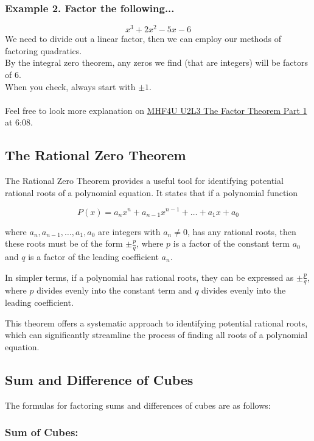 \documentclass{article}
\begin{document}
\subsubsection*{Example 2. Factor the following...}
$$x^3 + 2x^2 -5x - 6$$
We need to divide out a linear factor, then we can employ our
methods of factoring quadratics. \\
By the integral zero theorem, any zeros we find (that are integers)
will be factors of 6. \\
When you check, always start with $\pm 1$.\\\\
Feel free to look more explanation on \href{https://www.youtube.com/watch?v=7Hny2n6t83Y}{MHF4U U2L3 The Factor Theorem Part 1} at 6:08.

\subsection*{The Rational Zero Theorem}
The Rational Zero Theorem provides a useful tool for identifying potential rational roots of a polynomial equation. It states that if a polynomial function

\[ P(x) = a_nx^n + a_{n-1}x^{n-1} + \ldots + a_1x + a_0 \]

where \( a_n, a_{n-1}, \ldots, a_1, a_0 \) are integers with \( a_n \neq 0 \), has any rational roots, then these roots must be of the form \( \pm \frac{p}{q} \), where \( p \) is a factor of the constant term \( a_0 \) and \( q \) is a factor of the leading coefficient \( a_n \).

In simpler terms, if a polynomial has rational roots, they can be expressed as \( \pm \frac{p}{q} \), where \( p \) divides evenly into the constant term and \( q \) divides evenly into the leading coefficient.

This theorem offers a systematic approach to identifying potential rational roots, which can significantly streamline the process of finding all roots of a polynomial equation.

\subsection{Sum and Difference of Cubes}

The formulas for factoring sums and differences of cubes are as follows:

\subsubsection*{Sum of Cubes:}
\end{document}
